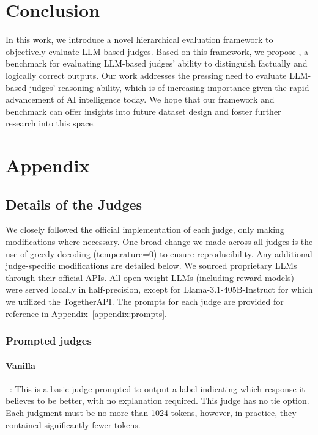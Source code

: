 \documentclass{article} %
\begin{document}
\section*{Conclusion}
In this work, we introduce a novel hierarchical evaluation framework to objectively evaluate LLM-based judges. Based on this framework, we propose \sys, a benchmark for evaluating LLM-based judges' ability to distinguish factually and logically correct outputs. Our work addresses the pressing need to evaluate LLM-based judges' reasoning ability, which is of increasing importance given the rapid advancement of AI intelligence today. We hope that our framework and benchmark can offer insights into future dataset design and foster further research into this space.




\appendix
\section{Appendix}
\subsection{Details of the Judges}
\label{appenix:judge-detail}
We closely followed the official implementation of each judge, only making modifications where necessary. One broad change we made across all judges is the use of greedy decoding (temperature=0) to ensure reproducibility. Any additional judge-specific modifications are detailed below. We sourced proprietary LLMs through their official APIs. All open-weight LLMs (including reward models) were served locally in half-precision, except for Llama-3.1-405B-Instruct for which we utilized the TogetherAPI. The prompts for each judge are provided for reference in Appendix~\ref{appendix:prompts}.

\subsubsection{Prompted judges}
\paragraph{Vanilla}~\citep{dubois2024alpacafarm}: This is a basic judge prompted to output a label indicating which response it believes to be better, with no explanation required. This judge has no tie option. Each judgment must be no more than 1024 tokens, however, in practice, they contained significantly fewer tokens. 
\end{document}
